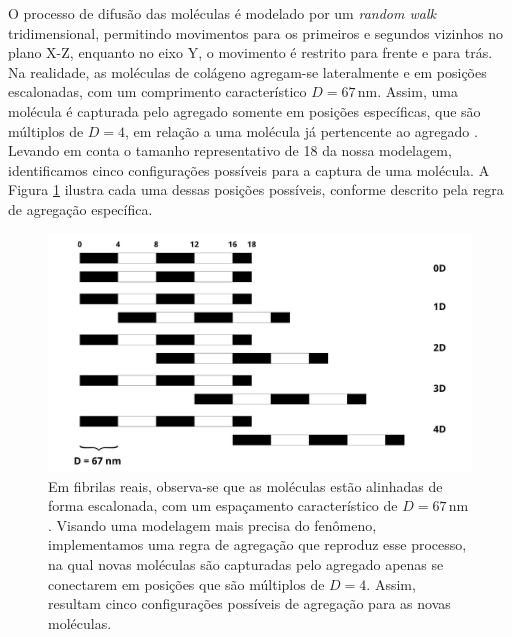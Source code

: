 \documentclass{article}
\begin{document}
        O processo de difusão das moléculas é modelado por um \textit{random walk} tridimensional, permitindo movimentos para os primeiros e 
        segundos vizinhos no plano X-Z, enquanto no eixo Y, o movimento é restrito para frente e para trás. Na realidade, as moléculas de colágeno 
        agregam-se lateralmente e em posições escalonadas, com um comprimento característico \(D = 67 \, \text{nm}\). Assim, uma molécula é 
        capturada pelo agregado somente em posições específicas, que são múltiplos de \(D = 4\), em relação a uma molécula já pertencente ao 
        agregado \cite{Parkinson1995}. Levando em conta o tamanho representativo de 18 da nossa modelagem, identificamos cinco configurações 
        possíveis para a captura de uma molécula. A Figura \ref{M2} ilustra cada uma dessas posições possíveis, conforme descrito pela regra de 
        agregação específica. 

        \begin{figure}[H]
            \centering
            \includegraphics[width=\textwidth]{figures/specific_bind.png}
    
            \caption{Em fibrilas reais, observa-se que as moléculas estão alinhadas de forma escalonada, com um espaçamento característico de 
            \(D = 67 \, \text{nm}\). Visando uma modelagem mais precisa do fenômeno, implementamos uma regra de agregação que reproduz esse 
            processo, na qual novas moléculas são capturadas pelo agregado apenas se conectarem em posições que são múltiplos de \(D = 4\). 
            Assim, resultam cinco configurações possíveis de agregação para as novas moléculas.}  
    
            \label{M2}
        \end{figure}
\end{document}
